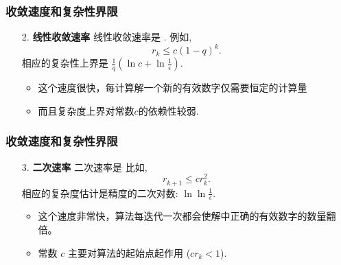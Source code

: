 \documentclass[handout,10pt]{beamer} %
\begin{document}
\begin{frame}[fragile]
\frametitle{收敛速度和复杂性界限}


\begin{enumerate}
	 
\item[2.] \textbf{线性收敛速率} 线性收敛速率是 . 例如,
$$
    r_k \leq c(1-q)^k.
$$
相应的复杂性上界是 $\frac{1}{q} ( \ln c + \ln \frac{1}{\epsilon})$.

\begin{itemize}
    \item 这个速度很快，每计算解一个新的有效数字仅需要恒定的计算量
    \item 而且复杂度上界对常数$c$的依赖性较弱.
\end{itemize}


\end{enumerate}



\end{frame}


\begin{frame}[fragile]
	\frametitle{收敛速度和复杂性界限}
	
	
	
	\begin{enumerate}
		
		\item[3.] \textbf{二次速率} 二次速率是  比如,
$$
    r_{k+1}^{} \leq c r_k^2.
$$
相应的复杂度估计是精度的二次对数: $\ln \ln \frac{1}{\epsilon}$.
\begin{itemize}
\item 这个速度非常快，算法每迭代一次都会使解中正确的有效数字的数量翻倍。
\item 常数 $c$ 主要对算法的起始点起作用 ($cr_k<1$).
\end{itemize}



\end{enumerate}



\end{frame}


\end{document}
